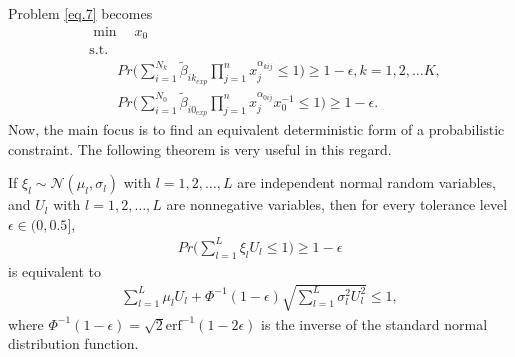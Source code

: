Problem \ref{eq.7} becomes
\begin{equation}\label{eq.10}
	\begin{aligned}
		&	\min \quad x_0 \\
		&	\text{s.t.}\\
		& \qquad Pr\bigg(\sum\limits_{i=1}^{N_k}{\tilde{\beta}}_{{ik}_{exp}}\prod\limits_{j=1}^{n}x_j^{\alpha_{kij}}\leq 1\bigg)\ge 1-\epsilon,k=1,2,\ldots K,\\
		& \qquad Pr\bigg(\sum\limits_{i=1}^{N_0}{\tilde{\beta}}_{{i0}_{exp}}\prod\limits_{j=1}^{n}x_j^{\alpha_{0ij}}x_0^{-1}\le 1\bigg)\ge 1-\epsilon.
	\end{aligned}
\end{equation}
Now, the main focus is to find an equivalent deterministic form of a probabilistic constraint. The following theorem is very useful in this regard.
\begin{theorem}\label{thm.6}
		If $\xi_l\sim\mathcal{N}(\mu_l,\sigma_l)$ with $l=1,2,\ldots,L$ are independent normal random variables, and $U_l$ with $l=1,2,\ldots,L$ are nonnegative variables, then for every tolerance level $\epsilon \in(0,0.5]$, 
		\begin{align*}
			Pr\bigg(\sum\limits_{l=1}^{L}\xi_lU_l\le 1\bigg)\ge 1-\epsilon
			\end{align*}
		is equivalent to
		\begin{align*}
			\sum\limits_{l=1}^{L}\mu_lU_l+\Phi^{-1}(1-\epsilon)\sqrt{\sum\limits_{l=1}^{L}\sigma_l^2U_l^2}\le 1,
		\end{align*}
	where $\Phi^{-1}(1-\epsilon)=\sqrt{2}\text{erf}^{-1}(1-2\epsilon)$ is the inverse of the standard normal distribution function.
	\end{theorem}
